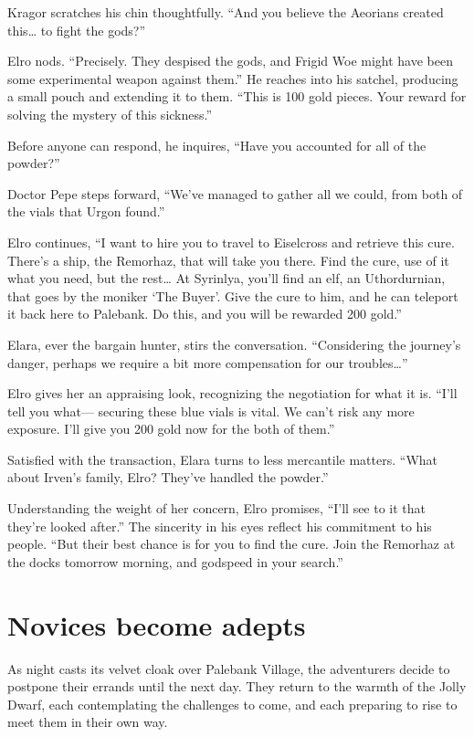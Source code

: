 \documentclass[
  letterpaper,12pt,twoside,twocolumn,openany,
  nodeprecatedcode,bg=full]{dndbook}
\begin{document}
Kragor scratches his chin thoughtfully. ``And you believe the Aeorians
created this\ldots{} to fight the gods?''

Elro nods. ``Precisely. They despised the gods, and Frigid Woe might
have been some experimental weapon against them.'' He reaches into his
satchel, producing a small pouch and extending it to them. ``This is 100
gold pieces. Your reward for solving the mystery of this sickness.''

Before anyone can respond, he inquires, ``Have you accounted for all of
the powder?''

Doctor Pepe steps forward, ``We've managed to gather all we could, from
both of the vials that Urgon found.''

Elro continues, ``I want to hire you to travel to Eiselcross and
retrieve this cure. There's a ship, the Remorhaz, that will take you
there. Find the cure, use of it what you need, but the rest\ldots{} At
Syrinlya, you'll find an elf, an Uthordurnian, that goes by the moniker
`The Buyer'. Give the cure to him, and he can teleport it back here to
Palebank. Do this, and you will be rewarded 200 gold.''

Elara, ever the bargain hunter, stirs the conversation. ``Considering
the journey's danger, perhaps we require a bit more compensation for our
troubles\ldots{}''

Elro gives her an appraising look, recognizing the negotiation for what
it is. ``I'll tell you what--- securing these blue vials is vital. We
can't risk any more exposure. I'll give you 200 gold now for the both of
them.''

Satisfied with the transaction, Elara turns to less mercantile matters.
``What about Irven's family, Elro? They've handled the powder.''

Understanding the weight of her concern, Elro promises, ``I'll see to it
that they're looked after.'' The sincerity in his eyes reflect his
commitment to his people. ``But their best chance is for you to find the
cure. Join the Remorhaz at the docks tomorrow morning, and godspeed in
your search.''

\section{Novices become adepts}\label{novices-become-adepts}

As night casts its velvet cloak over Palebank Village, the adventurers
decide to postpone their errands until the next day. They return to the
warmth of the Jolly Dwarf, each contemplating the challenges to come,
and each preparing to rise to meet them in their own way.
\end{document}
